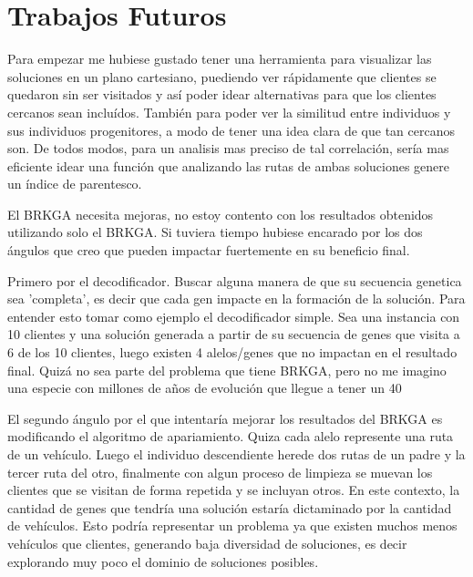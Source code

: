 \section{Trabajos Futuros}

Para empezar me hubiese gustado tener una herramienta para visualizar las soluciones en un plano cartesiano, puediendo ver rápidamente que clientes se quedaron sin ser visitados y así poder idear alternativas para que los clientes cercanos sean incluídos. También para poder ver la similitud entre individuos y sus individuos progenitores, a modo de tener una idea clara de que tan cercanos son. De todos modos, para un analisis mas preciso de tal correlación, sería mas eficiente idear una función que analizando las rutas de ambas soluciones genere un índice de parentesco.

\bigskip

El BRKGA necesita mejoras, no estoy contento con los resultados obtenidos utilizando solo el BRKGA. Si tuviera tiempo hubiese encarado por los dos ángulos que creo que pueden impactar fuertemente en su beneficio final. 

\bigskip

Primero por el decodificador. Buscar alguna manera de que su secuencia genetica sea 'completa', es decir que cada gen impacte en la formación de la solución. Para entender esto tomar como ejemplo el decodificador simple. Sea una instancia con 10 clientes y una solución generada a partir de su secuencia de genes que visita a 6 de los 10 clientes, luego existen 4 alelos/genes que no impactan en el resultado final. Quizá no sea parte del problema que tiene BRKGA, pero no me imagino una especie con millones de años de evolución que llegue a tener un 40%

\bigskip

El segundo ángulo por el que intentaría mejorar los resultados del BRKGA es modificando el algoritmo de apariamiento. Quiza cada alelo represente una ruta de un vehículo. Luego el individuo descendiente herede dos rutas de un padre y la tercer ruta del otro, finalmente con algun proceso de limpieza se muevan los clientes que se visitan de forma repetida y se incluyan otros. En este contexto, la cantidad de genes que tendría una solución estaría dictaminado por la cantidad de vehículos. Esto podría representar un problema ya que existen muchos menos vehículos que clientes, generando baja diversidad de soluciones, es decir explorando muy poco el dominio de soluciones posibles.

